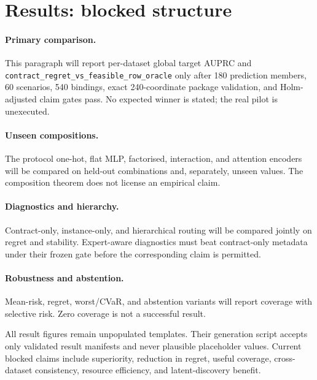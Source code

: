 \section{Results: blocked structure}




\paragraph{Primary comparison.}
 This paragraph will report per-dataset global target AUPRC and \texttt{contract\_regret\_vs\_feasible\_row\_oracle} only after 180 prediction members, 60 scenarios, 540 bindings, exact 240-coordinate package validation, and Holm-adjusted claim gates pass. No expected winner is stated; the real pilot is unexecuted.

\paragraph{Unseen compositions.}
 The protocol one-hot, flat MLP, factorised, interaction, and attention encoders will be compared on held-out combinations and, separately, unseen values. The composition theorem does not license an empirical claim.

\paragraph{Diagnostics and hierarchy.}
 Contract-only, instance-only, and hierarchical routing will be compared jointly on regret and stability. Expert-aware diagnostics must beat contract-only metadata under their frozen gate before the corresponding claim is permitted.

\paragraph{Robustness and abstention.}
 Mean-risk, regret, worst/CVaR, and abstention variants will report coverage with selective risk. Zero coverage is not a successful result.



All result figures remain unpopulated templates. Their generation script accepts only validated result manifests and never plausible placeholder values. Current blocked claims include superiority, reduction in regret, useful coverage, cross-dataset consistency, resource efficiency, and latent-discovery benefit.
